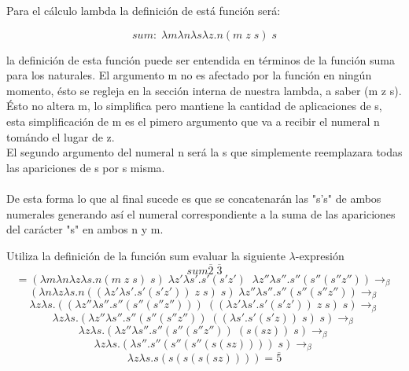         Para el cálculo lambda la definición de está función será:
        \begin{definition}
            $$sum:  \; \lambda m\lambda n\lambda s\lambda z.n(m \; z \; s) \; s$$
        \end{definition}

        la definición de esta función puede ser entendida en términos de la función suma para los naturales. El argumento m no es afectado por la función en ningún momento, ésto se regleja en la sección interna de nuestra lambda, a saber (m z s). Ésto no altera m, lo simplifica pero mantiene la cantidad de aplicaciones de s, esta simplificación de m es el pimero argumento que va a recibir el numeral n tomándo el lugar de z.\\
        El segundo argumento del numeral n será la s que simplemente reemplazara todas las apariciones de s por s misma.\\\\
        De esta forma lo que al final sucede es que se concatenarán las "s's" de ambos numerales generando así el numeral correspondiente a la suma de las apariciones del carácter "s" en ambos n y m.\\


        \begin{exercise}
            Utiliza la definición de la función sum evaluar la siguiente  $\lambda$-expresión
            \[
                sum  \overline{2} \; \overline{3} 
            \]
            \[
                = (\lambda m\lambda n\lambda z\lambda s.n(m \; z \; s) \; s) \; \lambda z'\lambda s'.s'(s'z') \;\; \lambda z''\lambda s''.s''(s''(s''z'')) \rightarrow_\beta 
            \]
            \[
                (\lambda n\lambda z\lambda s.n((\lambda z'\lambda s'.s'(s'z')) \; z \; s) \; s) \; \lambda z''\lambda s''.s''(s''(s''z'')) \rightarrow_\beta 
            \]
            \[
                \lambda z\lambda s.((\lambda z''\lambda s''.s''(s''(s''z''))) \; ((\lambda z'\lambda s'.s'(s'z')) \; z \; s) \; s) \rightarrow_\beta
            \]
            \[
                \lambda z\lambda s.(\lambda z''\lambda s''.s''(s''(s''z'')) \; ((\lambda s'.s'(s'z))  \; s) \; s) \rightarrow_\beta
            \]
            \[
                \lambda z\lambda s.(\lambda z''\lambda s''.s''(s''(s''z'')) \; (s(sz)) \; s) \rightarrow_\beta
            \]
            \[
                \lambda z\lambda s.(\lambda s''.s''(s''(s''(s(sz)))) \; s) \rightarrow_\beta
            \]
            \[
                \lambda z\lambda s.s(s(s(s(sz)))) = \overline{5}
            \]
        \end{exercise}

